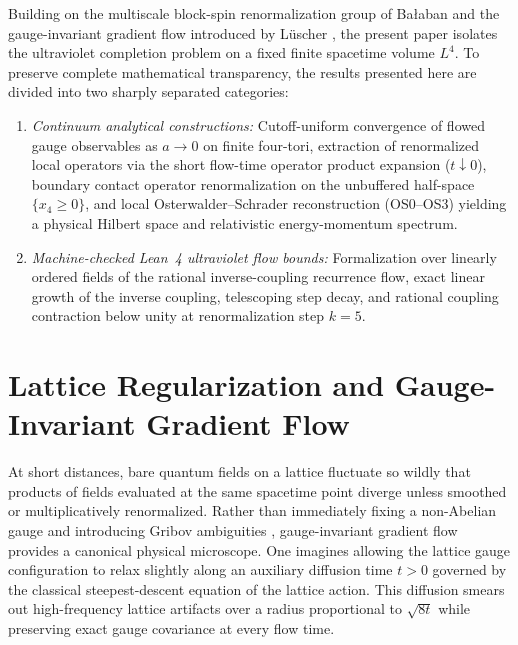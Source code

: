 \documentclass[11pt,a4paper]{article}
\begin{document}
Building on the multiscale block-spin renormalization group of Ba{\l}aban \cite{Balaban1985CMP99,Balaban1987CMP109,Balaban1988CMP116,Balaban1989CMP122} and the gauge-invariant gradient flow introduced by L\"uscher \cite{Luscher2010JHEP,LuscherWeisz2011JHEP}, the present paper isolates the ultraviolet completion problem on a fixed finite spacetime volume $L^4$. To preserve complete mathematical transparency, the results presented here are divided into two sharply separated categories:
\begin{enumerate}
\item \emph{Continuum analytical constructions:} Cutoff-uniform convergence of flowed gauge observables as $a \to 0$ on finite four-tori, extraction of renormalized local operators via the short flow-time operator product expansion ($t \downarrow 0$), boundary contact operator renormalization on the unbuffered half-space $\{x_4 \ge 0\}$, and local Osterwalder--Schrader reconstruction (OS0--OS3) yielding a physical Hilbert space and relativistic energy-momentum spectrum.
\item \emph{Machine-checked Lean~4 ultraviolet flow bounds:} Formalization over linearly ordered fields of the rational inverse-coupling recurrence flow, exact linear growth of the inverse coupling, telescoping step decay, and rational coupling contraction below unity at renormalization step $k = 5$.
\end{enumerate}

\section{Lattice Regularization and Gauge-Invariant Gradient Flow}
At short distances, bare quantum fields on a lattice fluctuate so wildly that products of fields evaluated at the same spacetime point diverge unless smoothed or multiplicatively renormalized. Rather than immediately fixing a non-Abelian gauge and introducing Gribov ambiguities \cite{Gribov1978}, gauge-invariant gradient flow provides a canonical physical microscope. One imagines allowing the lattice gauge configuration to relax slightly along an auxiliary diffusion time $t > 0$ governed by the classical steepest-descent equation of the lattice action. This diffusion smears out high-frequency lattice artifacts over a radius proportional to $\sqrt{8t}$ while preserving exact gauge covariance at every flow time.
\end{document}
